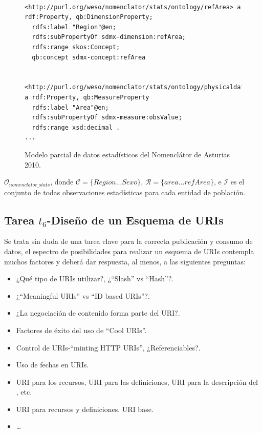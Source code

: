 \begin{figure}[!htp]
\begin{lstlisting}
 
<http://purl.org/weso/nomenclator/stats/ontology/refArea> a rdf:Property, qb:DimensionProperty;
  rdfs:label "Region"@en;
  rdfs:subPropertyOf sdmx-dimension:refArea;
  rdfs:range skos:Concept;
  qb:concept sdmx-concept:refArea 
	

<http://purl.org/weso/nomenclator/stats/ontology/physicaldata/area> a rdf:Property, qb:MeasureProperty
  rdfs:label "Area"@en;
  rdfs:subPropertyOf sdmx-measure:obsValue;
  rdfs:range xsd:decimal .
...
\end{lstlisting}
	\caption{Modelo parcial de datos estadísticos del Nomenclátor de Asturias 2010.}
	\label{fig:modelo-nomen-stats}
\end{figure}


$\mathcal{O}_{nomenclator\_stats}$, donde $\mathcal{C} = \{Region...Sexo\}$, $\mathcal{R} = \{area...refArea\}$,
e $\mathcal{I}$ es el conjunto de todas observaciones estadísticas para cada entidad de población.

\subsection{Tarea $t_6$-Diseño de un Esquema de URIs}
Se trata sin duda de una tarea clave para la correcta publicación y consumo de datos, el espectro de posibilidades
para realizar un esquema de \gls{URI}s contempla muchos factores y deberá dar respuesta, al menos, a las
siguientes preguntas:

\begin{itemize}
 \item ¿Qué tipo de URIs utilizar?, ¿``Slash'' vs ``Hash''?.
 \item ¿``Meaningful URIs'' vs ``ID based URIs''?.
 \item ¿La negociación de contenido forma parte del URI?.
 \item Factores de éxito del uso de ``Cool URIs''.
 \item Control de URIs-``minting \gls{HTTP URI}s'', ¿Referenciables?.
 \item Uso de fechas en URIs. 
 \item URI para los recursos, URI para las definiciones, URI para la descripción del \dataset, etc.
 \item URI para recursos y definiciones. URI base.
 \item \ldots
\end{itemize}

